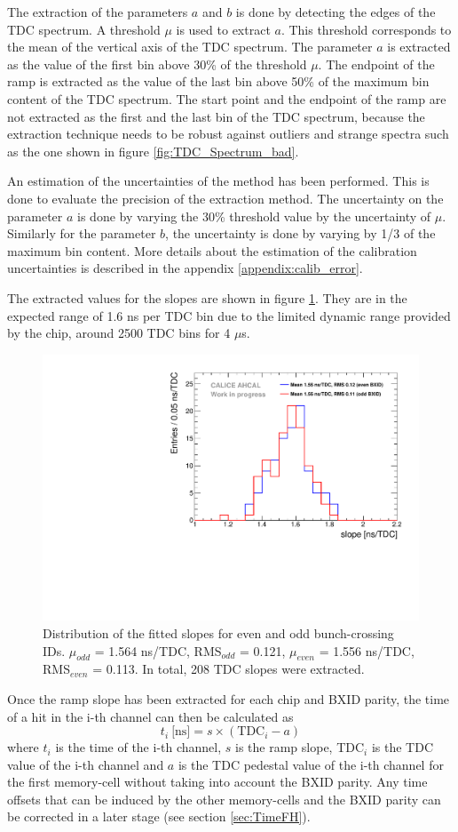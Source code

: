 The extraction of the parameters $a$ and $b$ is done by detecting the edges of the TDC spectrum. A threshold $\mu$ is used to extract $a$. This threshold corresponds to the mean of the vertical axis of the TDC spectrum. The parameter $a$ is extracted as the value of the first bin above 30\% of the threshold $\mu$. The endpoint of the ramp is extracted as the value of the last bin above 50\% of the maximum bin content of the TDC spectrum. The start point and the endpoint of the ramp are not extracted as the first and the last bin of the TDC spectrum, because the extraction technique needs to be robust against outliers and strange spectra such as the one shown in figure \ref{fig:TDC_Spectrum_bad}.

An estimation of the uncertainties of the method has been performed. This is done to evaluate the precision of the extraction method. The uncertainty on the parameter $a$ is done by varying the 30\% threshold value by the uncertainty of $\mu$. Similarly for the parameter $b$, the uncertainty is done by varying by 1/3 of the maximum bin content. More details about the estimation of the calibration uncertainties is described in the appendix \ref{appendix:calib_error}.

The extracted values for the slopes are shown in figure \ref{fig:slope_time}. They are in the expected range of 1.6 ns per TDC bin due to the limited dynamic range provided by the chip, around 2500 TDC bins for 4 $\mu$s.

\begin{figure}[htbp!]
	\centering
	\includegraphics[width=0.5\linewidth]{../Thesis_Plots/Timing/Muons/Plots/SlopesTDC.pdf}
	\caption{Distribution of the fitted slopes for even and odd bunch-crossing IDs. $\mu_{odd}$ = 1.564 ns/TDC, RMS$_{odd}$ = 0.121, $\mu_{even}$ = 1.556 ns/TDC, RMS$_{even}$ = 0.113. In total, 208 TDC slopes were extracted.} \label{fig:slope_time}
\end{figure}

Once the ramp slope has been extracted for each chip and BXID parity, the time of a hit in the i-th channel can then be calculated as
\begin{equation} \label{eq:time_chn}
	t_{i} \: \text{[ns]} = s \times (\text{TDC}_{i} - a)
\end{equation}
where $t_{i}$ is the time of the i-th channel, $s$ is the ramp slope, TDC$_{i}$ is the TDC value of the i-th channel and $a$ is the TDC pedestal value of the i-th channel for the first memory-cell without taking into account the BXID parity. Any time offsets that can be induced by the other memory-cells and the BXID parity can be corrected in a later stage (see section \ref{sec:TimeFH}).

